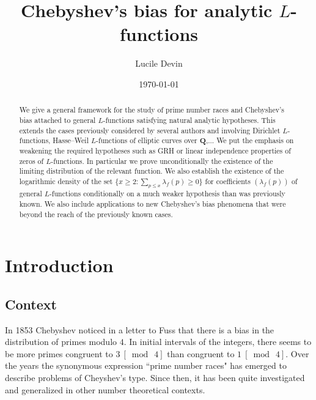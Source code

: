 \documentclass[a4paper,10pt]{amsart}
\theoremstyle{plain}
\theoremstyle{definition}
\begin{document}
\title{Chebyshev's bias for analytic $L$-functions}
\author{Lucile Devin}
\address{Laboratoire de Math{\'e}matiques d'Orsay \\ Univ. Paris-Sud \\ CNRS \\ Universit{\'e} Paris-Saclay \\ 91405 Orsay  \\ France}
\keywords{}
\date\today

\begin{abstract}
We give a general framework for the study of prime number races and Chebyshev's bias attached to general $L$-functions satisfying natural analytic hypotheses.
This extends the cases previously considered by several authors and involving Dirichlet $L$-functions, Hasse--Weil $L$-functions of elliptic curves over $\mathbf{Q}$,... 
We put the emphasis on weakening the required hypotheses such as GRH or linear independence properties of zeros of $L$-functions.
In particular we prove unconditionally the existence of the limiting distribution of the relevant function.
We also establish the existence of the logarithmic density of the set 
$\lbrace x\geq 2 : \sum_{p\leq x} \lambda_{f}(p) \geq 0 \rbrace$ 
 for coefficients $(\lambda_{f}(p))$ of general $L$-functions conditionally on a much weaker hypothesis than was previously known. We also include applications to new Chebyshev's bias phenomena that were beyond the reach of the previously known cases.
\end{abstract}

\maketitle

\section{Introduction}

\subsection{Context}

In 1853 Chebyshev noticed in a letter to Fuss that 
there is a bias in the distribution of primes modulo $4$.
In initial intervals of the integers, 
there seems to be more primes congruent to $3\ [\bmod\ 4]$ than congruent to $1\ [\bmod\ 4]$.
Over the years the synonymous expression ``prime number races" has emerged to describe problems of Cheyshev's type.
Since then, it has been quite investigated and generalized in other number theoretical contexts.
\end{document}
